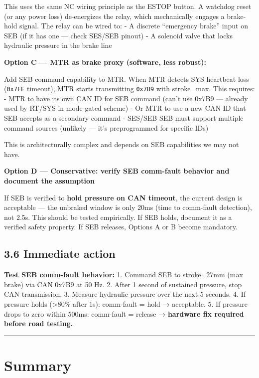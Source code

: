 \documentclass[12pt,a4paper,oneside]{report}
\begin{document}
This uses the same NC wiring principle as the ESTOP button. A watchdog reset (or
any power loss) de-energizes the relay, which mechanically engages a brake-hold
signal. The relay can be wired to: - A discrete ``emergency brake'' input on SEB
(if it has one --- check SES/SEB pinout) - A solenoid valve that locks hydraulic
pressure in the brake line

\textbf{Option C --- MTR as brake proxy (software, less robust):}

Add SEB command capability to MTR. When MTR detects SYS heartbeat loss
(\texttt{0x7FE} timeout), MTR starts transmitting \texttt{0x7B9} with
stroke=max. This requires: - MTR to have its own CAN ID for SEB command (can't
use 0x7B9 --- already used by RT/SYS in mode-gated scheme) - Or MTR to use a new
CAN ID that SEB accepts as a secondary command - SES/SEB SEB must support
multiple command sources (unlikely --- it's preprogrammed for specific IDs)

This is architecturally complex and depends on SEB capabilities we may not have.

\textbf{Option D --- Conservative: verify SEB comm-fault behavior and document
the assumption}

If SEB is verified to \textbf{hold pressure on CAN timeout}, the current design
is acceptable --- the unbraked window is only 20ms (time to comm-fault
detection), not 2.5s. This should be tested empirically. If SEB holds, document
it as a verified safety property. If SEB releases, Options A or B become
mandatory.

\subsection{3.6 Immediate action}\label{immediate-action}

\textbf{Test SEB comm-fault behavior:} 1. Command SEB to stroke=27mm (max brake)
via CAN 0x7B9 at 50 Hz. 2. After 1 second of sustained pressure, stop CAN
transmission. 3. Measure hydraulic pressure over the next 5 seconds. 4. If
pressure holds (\textgreater80\% after 1s): comm-fault = hold → acceptable. 5.
If pressure drops to zero within 500ms: comm-fault = release → \textbf{hardware
fix required before road testing.}

\begin{center}\rule{0.5\linewidth}{0.5pt}\end{center}

\section{Summary}\label{summary}
\end{document}
